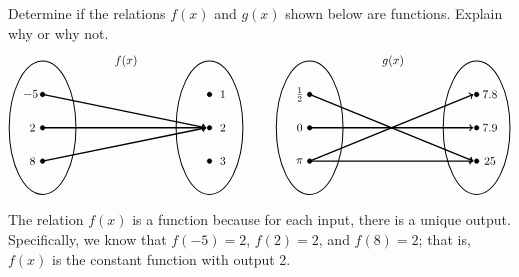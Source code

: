 \documentclass[11pt,letterpaper]{article}
\begin{document}

 Determine if the relations $f(x)$ and $g(x)$ shown below are functions. Explain why or why not. 
	\[
	\begin{tikzpicture}
	\node at (2.5,2) {$f(x)$};
	\draw[line width=0.03cm] (0,0) circle (1 and 2);
	\draw[line width=0.03cm] (5,0) circle (1 and 2);
	
	\draw[fill=black] (0,1) circle (0.07);
	\draw[fill=black] (0,0) circle (0.07);
	\draw[fill=black] (0,-1) circle (0.07);
	
	\draw[fill=black] (5,1) circle (0.07);
	\draw[fill=black] (5,0) circle (0.07);
	\draw[fill=black] (5,-1) circle (0.07);
	
	\draw[line width=0.04cm,->] (0,1) -- (4.9,0);
	\draw[line width=0.04cm,->] (0,0) -- (4.9,0);
	\draw[line width=0.04cm,->] (0,-1) -- (4.9,0);
	
	\node at (-0.3,1) {$\!\!-5$};
	\node at (-0.3,0) {$2$};
	\node at (-0.3,-1) {$8$};
	
	\node at (5.4,1) {$1$};
	\node at (5.4,0) {$2$};
	\node at (5.4,-1) {$3$};
	
	\tikzset{shift={(8,0)}}
	\node at (2.5,2) {$g(x)$};
	\draw[line width=0.03cm] (0,0) circle (1 and 2);
	\draw[line width=0.03cm] (5,0) circle (1 and 2);
	
	\draw[fill=black] (0,1) circle (0.07);
	\draw[fill=black] (0,0) circle (0.07);
	\draw[fill=black] (0,-1) circle (0.07);
	
	\draw[fill=black] (5,1) circle (0.07);
	\draw[fill=black] (5,0) circle (0.07);
	\draw[fill=black] (5,-1) circle (0.07);
	
	\draw[line width=0.04cm,->] (0,1) -- (4.9,-1);
	\draw[line width=0.04cm,->] (0,0) -- (4.9,0);
	\draw[line width=0.04cm,->] (0,-1) -- (4.9,1);
	\draw[line width=0.04cm,->] (0,-1) -- (4.9,-1);
	
	\node at (-0.3,1) {$\frac{1}{2}$};
	\node at (-0.3,0) {$0$};
	\node at (-0.3,-1) {$\pi$};
	
	\node at (5.4,1) {$7.8$};
	\node at (5.4,0) {$7.9$};
	\node at (5.4,-1) {$25$};
	\end{tikzpicture}
	\] \pspace

\sol The relation $f(x)$ is a function because for each input, there is a unique output. Specifically, we know that $f(-5)= 2$, $f(2)= 2$, and $f(8)= 2$; that is, $f(x)$ is the constant function with output 2. \pspace
\end{document}
